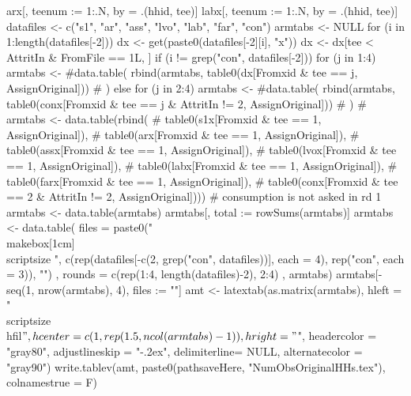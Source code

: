 \begin{Schunk}
\begin{Sinput}
arx[, teenum := 1:.N, by = .(hhid, tee)]
labx[, teenum := 1:.N, by = .(hhid, tee)]
datafiles <- c("s1", "ar", "ass", "lvo", "lab", "far", "con")
armtabs <- NULL
for (i in 1:length(datafiles[-2])) {
  dx <- get(paste0(datafiles[-2][i], "x"))
  dx <- dx[tee < AttritIn & FromFile == 1L, ]
  if (i != grep("con", datafiles[-2])) {
    for (j in 1:4)
      armtabs <- 
      #data.table(
      rbind(armtabs,
        table0(dx[Fromxid & tee == j, AssignOriginal]))
      #  )
  } else
    for (j in 2:4)
      armtabs <- 
      #data.table(
      rbind(armtabs,
        table0(conx[Fromxid & tee == j & AttritIn != 2, AssignOriginal]))
      #  )
}
# armtabs <- data.table(rbind(
#     table0(s1x[Fromxid & tee == 1, AssignOriginal]),
#     table0(arx[Fromxid & tee == 1, AssignOriginal]),
#     table0(assx[Fromxid & tee == 1, AssignOriginal]), 
#     table0(lvox[Fromxid & tee == 1, AssignOriginal]), 
#     table0(labx[Fromxid & tee == 1, AssignOriginal]),
#     table0(farx[Fromxid & tee == 1, AssignOriginal]),
#     table0(conx[Fromxid & tee == 2 & AttritIn != 2, AssignOriginal])))
    # consumption is not asked in rd 1
armtabs <- data.table(armtabs)
armtabs[, total := rowSums(armtabs)]
armtabs <- data.table(
  files = 
    paste0("\\makebox[1cm]{\\scriptsize ", 
      c(rep(datafiles[-c(2, grep("con", datafiles))], each = 4), 
        rep("con", each = 3)),
      "}")
  , 
  rounds = 
    c(rep(1:4, length(datafiles)-2), 2:4)
  , armtabs)
armtabs[-seq(1, nrow(armtabs), 4), files := ""]
amt <- latextab(as.matrix(armtabs), 
  hleft = "\\scriptsize\\hfil$", hcenter = c(1, rep(1.5, ncol(armtabs)-1)), hright = "$", 
  headercolor = "gray80", adjustlineskip = "-.2ex", delimiterline= NULL,
  alternatecolor = "gray90")
write.tablev(amt,  paste0(pathsaveHere, "NumObsOriginalHHs.tex"),
  colnamestrue = F)
\end{Sinput}
\end{Schunk}

